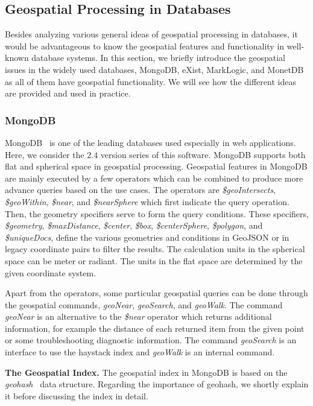 \documentclass[a4paper,12pt]{article}
\begin{document}
\subsection{Geospatial Processing in Databases} 
\label{s.dbs}
Besides analyzing various general ideas of geospatial processing in databases, it would be advantageous to know the geospatial features and functionality in well-known database systems. In this section, we briefly introduce the geospatial issues in the widely used databases, MongoDB, eXist, MarkLogic, and MonetDB as all of them have geospatial functionality. We will see how the different ideas are provided and used in practice.

\subsubsection{MongoDB}
\label{mongo}
MongoDB~\cite{mongogeneral2010,mongoinaction2011} is one of the leading databases used especially in web applications. Here, we consider the $2.4$ version series of this software. MongoDB supports both flat and spherical space in geospatial processing. Geospatial features in MongoDB are mainly executed by a few operators which can be combined to produce more advance queries based on the use cases. 
The operators are \textit{\$geoIntersects}, \textit{\$geoWithin}, \textit{\$near}, and \textit{\$nearSphere} which first indicate the query operation. Then, the geometry specifiers serve to form the query conditions. These specifiers, \textit{\$geometry}, \textit{\$maxDistance}, \textit{\$center}, \textit{\$box}, \textit{\$centerSphere}, \textit{\$polygon}, and \textit{\$uniqueDocs}, define the various geometries and conditions in GeoJSON or in legacy coordinate pairs to filter the results. The calculation units in the spherical space can be meter or radiant. The units in the flat space are determined by the given coordinate system. 

Apart from the operators, some particular geospatial queries can be done through the geospatial commands, 
\textit{geoNear}, \textit{geoSearch}, and \textit{geoWalk}. The command \textit{geoNear} is an alternative to the \textit{\$near} operator which returns additional information, for example the distance of each returned item from the given point or some troubleshooting diagnostic information. The command \textit{geoSearch} is an interface to use the haystack index and \textit{geoWalk} is an internal command.

\textbf{The Geospatial Index.}
The geospatial index in MongoDB is based on the \textit{geohash}~\cite{www/geohash} data structure. Regarding the importance of geohash, we shortly explain it before discussing the index in detail.
\end{document}
